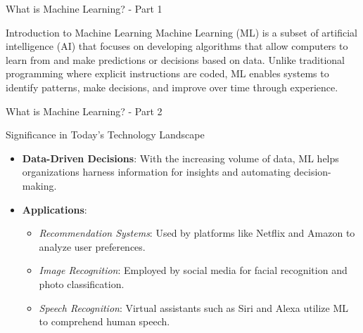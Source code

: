 \documentclass[aspectratio=169]{beamer}
\begin{document}
\begin{frame}[fragile]{What is Machine Learning? - Part 1}
  \begin{block}{Introduction to Machine Learning}
    Machine Learning (ML) is a subset of artificial intelligence (AI) that focuses on developing algorithms that allow computers to learn from and make predictions or decisions based on data. Unlike traditional programming where explicit instructions are coded, ML enables systems to identify patterns, make decisions, and improve over time through experience.
  \end{block}
\end{frame}

\begin{frame}[fragile]{What is Machine Learning? - Part 2}
  \begin{block}{Significance in Today’s Technology Landscape}
    \begin{itemize}
      \item \textbf{Data-Driven Decisions}: With the increasing volume of data, ML helps organizations harness information for insights and automating decision-making.
      \item \textbf{Applications}:
        \begin{itemize}
          \item \textit{Recommendation Systems}: Used by platforms like Netflix and Amazon to analyze user preferences.
          \item \textit{Image Recognition}: Employed by social media for facial recognition and photo classification.
          \item \textit{Speech Recognition}: Virtual assistants such as Siri and Alexa utilize ML to comprehend human speech.
        \end{itemize}
    \end{itemize}
  \end{block}
\end{frame}
\end{document}
